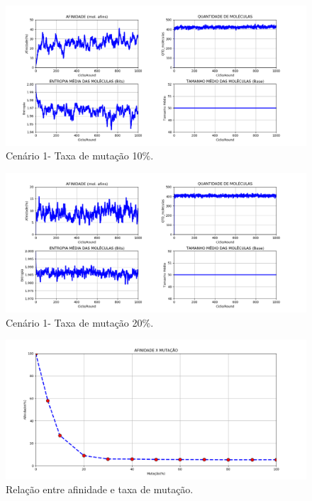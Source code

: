 \begin{figure}[!h]
    \centering
    \includegraphics[width=15cm]{figures/image3_alpha10_beta_20.png}
    \caption{Cenário 1- Taxa de mutação 10\%.}
    \label{fig:image3_alpha10_beta_20}
\end{figure}


\begin{figure}[!h]
    \centering
    \includegraphics[width=15cm]{figures/image4_alpha20_beta_20.png}
    \caption{Cenário 1- Taxa de mutação 20\%.}
    \label{fig:image4_alpha20_beta_20}
\end{figure}

\begin{figure}[!h]
    \centering
    \includegraphics[width=15cm]{figures/affinity_mutation.png}
    \caption{Relação entre afinidade e taxa de mutação.}
    \label{fig:affinity_mutation}
\end{figure}

